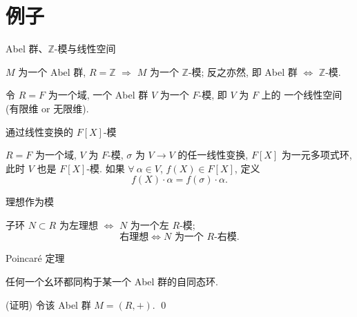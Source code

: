 
\section[例子]{例子}


\begin{frame}{Abel 群、$\mathbb{Z}$-模与线性空间}

\begin{eg}
$M$ 为一个 Abel 群, $R = \mathbb{Z}$
$\Longrightarrow$ $M$ 为一个 $\mathbb{Z}$-模; 反之亦然,
即 Abel 群 $\iff$ $\mathbb{Z}$-模.
\end{eg}

\pause

\begin{eg}[线性空间]
令 $R = F$ 为一个域, 一个 Abel 群 $V$ 为一个 $F$-模, 即 $V$ 为 $F$ 上的
一个线性空间 (有限维 or 无限维).
\end{eg}

\end{frame}


\begin{frame}{通过线性变换的 $F[X]$-模}

\begin{eg}[{$F[X]$}-模]
$R = F$ 为一个域, $V$ 为 $F$-模, $\sigma$ 为 $V \to V$ 的任一线性变换,
$F[X]$ 为一元多项式环, 此时 $V$ 也是 $F[X]$-模.
如果 $\forall\ \alpha \in V$, $f(X) \in F[X]$, 定义
\[
f(X) \cdot \alpha = f(\sigma) \cdot \alpha .
\]
\end{eg}

\end{frame}


\begin{frame}{理想作为模}

\begin{eg}[理想作为模]
子环 $N \subset R$ 为左理想 $\iff$ $N$ 为一个左 $R$-模;
\[
\text{右理想} \iff N \text{ 为一个 } R\text{-右模}.
\]
\end{eg}

\end{frame}


\begin{frame}{Poincar\'e 定理}

\begin{thm}[Poincar\'e 定理]
任何一个幺环都同构于某一个 Abel 群的自同态环.
\end{thm}

\startproof[bg=yellow, fg=red](证明)
令该 Abel 群 $M = (R, +)$.
\qed

\end{frame}

